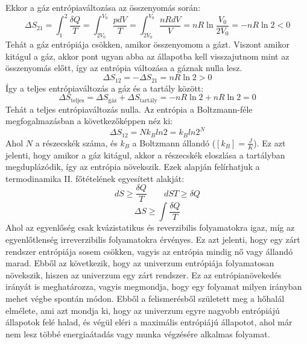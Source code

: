 \documentclass[../main.tex]{subfiles}
\begin{document}
Ekkor a gáz entrópiaváltozása az összenyomás során:
\begin{equation}
    \Delta S_{21} = \int_{1}^{2} \frac{\delta Q}{T} = \int_{2V_0}^{V_0} \frac{pdV}{T} = \int_{2V_0}^{V_0} \frac{nR dV}{V} = n R \ln{\frac{V_0}{2V_0}} = - n R \ln{2} < 0
\end{equation}
Tehát a gáz entrópiája csökken, amikor összenyomom a gázt. Viszont amikor kitágul a gáz, akkor pont ugyan abba az állapotba kell visszajutnom mint az összenyomás előtt, így az entrópia változása a gáznak nulla lesz.
\begin{equation}
    \Delta S_{12} = - \Delta S_{21} = n R \ln{2} > 0
\end{equation}
Így a teljes entrópiaváltozás a gáz és a tartály között:
\begin{equation}
    \Delta S_{\text{teljes}} = \Delta S_{\text{gáz}} + \Delta S_{\text{tartály}} = - n R \ln{2} + n R \ln{2} = 0
\end{equation}
Tehát a teljes entrópiaváltozás nulla. Az entrópia a Boltzmann-féle megfogalmazásban a következőképpen néz ki:
\begin{equation}
    \Delta S_{12} = N k_B ln2 = k_B ln2^{N} 
\end{equation}
Ahol $N$ a részecskék száma, és $k_B$ a Boltzmann állandó ($\left[k_B\right] = \frac{J}{K}$). Ez azt jelenti, hogy amikor a gáz kitágul, akkor a részecskék eloszlása a tartályban megduplázódik, így az entrópia növekszik.
\newline
\newline
Ezek alapján felírhatjuk a termodinamika II. főtételének egyesített alakját:
\begin{equation}
     dS \geq \frac{\delta Q}{T} \qquad dS T \geq \delta Q
\end{equation}
\begin{equation}
    \boxed{\Delta S \geq \int \frac{\delta Q}{T}}
\end{equation}
Ahol az egyenlőség csak kvázistatikus és reverzibilis folyamatokra igaz, míg az egyenlőtlenség irreverzibilis folyamatokra érvényes.
Ez azt jelenti, hogy egy zárt rendszer entrópiája sosem csökken, vagyis az entrópia mindig nő vagy állandó marad. Ebből az következik,
hogy az univerzum entrópiája folyamatosan növekszik, hiszen az univerzum egy zárt rendszer. Ez az entrópianövekedés irányát is meghatározza, vagyis megmondja, hogy egy folyamat milyen irányban mehet végbe spontán módon.
Ebből a felismerésből született meg a hőhalál elmélete, ami azt mondja ki, hogy az univerzum egyre nagyobb entrópiájú állapotok felé halad, és végül eléri a maximális entrópiájú állapotot, ahol már nem lesz többé energiaátadás vagy munka végzésére alkalmas folyamat.
\end{document}
